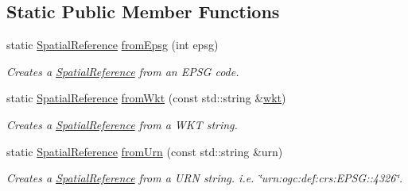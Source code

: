 \subsection*{Static Public Member Functions}
\begin{DoxyCompactItemize}
\item 
static \hyperlink{classdg_1_1deepcore_1_1imagery_1_1_spatial_reference}{Spatial\+Reference} \hyperlink{group___imagery_module_ga417fb1f2ed62599e7e321d47b3f12121}{from\+Epsg} (int epsg)
\begin{DoxyCompactList}\small\item\em Creates a \hyperlink{classdg_1_1deepcore_1_1imagery_1_1_spatial_reference}{Spatial\+Reference} from an E\+P\+SG code. \end{DoxyCompactList}\item 
static \hyperlink{classdg_1_1deepcore_1_1imagery_1_1_spatial_reference}{Spatial\+Reference} \hyperlink{group___imagery_module_ga42fc95755f822f64974facd09edcd716}{from\+Wkt} (const std\+::string \&\hyperlink{group___imagery_module_ga8654dc584206ce3675ee3330a94c06c9}{wkt})
\begin{DoxyCompactList}\small\item\em Creates a \hyperlink{classdg_1_1deepcore_1_1imagery_1_1_spatial_reference}{Spatial\+Reference} from a W\+KT string. \end{DoxyCompactList}\item 
static \hyperlink{classdg_1_1deepcore_1_1imagery_1_1_spatial_reference}{Spatial\+Reference} \hyperlink{group___imagery_module_ga095e8735cdb0a9a8f72fbb1351e86d95}{from\+Urn} (const std\+::string \&urn)
\begin{DoxyCompactList}\small\item\em Creates a \hyperlink{classdg_1_1deepcore_1_1imagery_1_1_spatial_reference}{Spatial\+Reference} from a U\+RN string. i.\+e. \char`\"{}urn\+:ogc\+:def\+:crs\+:\+E\+P\+S\+G\+::4326\char`\"{}. \end{DoxyCompactList}\end{DoxyCompactItemize}
